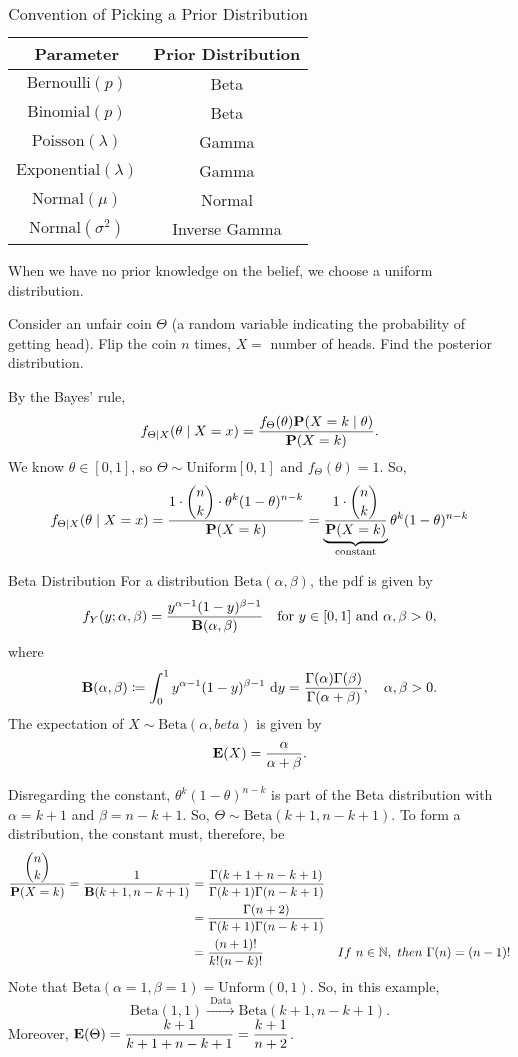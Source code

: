 \begin{table}[H]
\caption{Convention of Picking a Prior Distribution}
\begin{center}
\begin{tabular}{c|c}	
	Parameter&Prior Distribution\\\hline
	$\text{Bernoulli}(p)$&Beta\\
	$\text{Binomial}(p)$&Beta\\
	$\text{Poisson}(\lambda)$&Gamma\\
	$\text{Exponential}(\lambda)$&Gamma\\
	$\text{Normal}(\mu)$&Normal\\
	$\text{Normal}(\sigma^2)$&Inverse Gamma
\end{tabular}
\end{center}
\end{table}
\begin{rmk}
	When we have no prior knowledge on the belief, we choose a uniform distribution.	
\end{rmk}
\begin{eg}
	Consider an unfair coin $\Theta$ (a random variable indicating the probability of getting head). Flip the coin $n$ times, $X=$ number of heads. Find the posterior distribution. 
	\begin{sol}
		By the Bayes' rule, \[f_{\Theta\mid X}(\theta\mid X=x)=\dfrac{f_\Theta(\theta)\P(X=k\mid\theta)}{\P(X=k)}.\] We know $\theta\in[0,1]$, so $\Theta\sim\text{Uniform}[0,1]$ and $f_\Theta(\theta)=1$. So, \[f_{\Theta\mid X}(\theta\mid X=x)=\dfrac{1\cdot\dsst\binom{n}{k}\cdot\theta^k(1-\theta)^{n-k}}{\P(X=k)}=\underbrace{\dfrac{1\cdot\dsst\binom{n}{k}}{\P(X=k)}}_\text{constant}\theta^k(1-\theta)^{n-k}\]
		\begin{df}{Beta Distribution}
			For a distribution $\text{Beta}(\alpha,\beta)$, the pdf is given by \[f_Y(y;\alpha,\beta)=\dfrac{y^{\alpha-1}(1-y)^{\beta-1}}{\B(\alpha,\beta)}\quad\text{for }y\in[0,1]\text{ and }\alpha,\beta>0,\] where \[\B(\alpha,\beta)\coloneqq\int_0^1y^{\alpha-1}(1-y)^{\beta-1}\ \d{y}=\dfrac{\Gamma(\alpha)\Gamma(\beta)}{\Gamma(\alpha+\beta)},\quad\alpha,\beta>0.\] The expectation of $X\sim\text{Beta}(\alpha,beta)$ is given by \[\E(X)=\dfrac{\alpha}{\alpha+\beta}.\]
		\end{df}
		Disregarding the constant, $\theta^k(1-\theta)^{n-k}$ is part of the Beta distribution with $\alpha=k+1$ and $\beta=n-k+1$. So, $\Theta\sim\text{Beta}(k+1,n-k+1)$. To form a distribution, the constant must, therefore, be \begin{align*}\dfrac{\dsst\binom{n}{k}}{\P(X=k)}=\dfrac{1}{\B(k+1,n-k+1)}&=\dfrac{\Gamma(k+1+n-k+1)}{\Gamma(k+1)\Gamma(n-k+1)}\\&=\dfrac{\Gamma(n+2)}{\Gamma(k+1)\Gamma(n-k+1)}\\&=\dfrac{(n+1)!}{k!(n-k)!}&If\ n\in\N,\ then\ \Gamma(n)=(n-1)!\end{align*}
		Note that \underline{$\text{Beta}(\alpha=1,\beta=1)=\text{Unform}(0,1)$}. So, in this example, \[\text{Beta}(1,1)\xrightarrow{\text{ Data }}\text{Beta}(k+1,n-k+1).\]
		Moreover, $\E(\Theta)=\dfrac{k+1}{k+1+n-k+1}=\dfrac{k+1}{n+2}$.
	\end{sol}
\end{eg}
